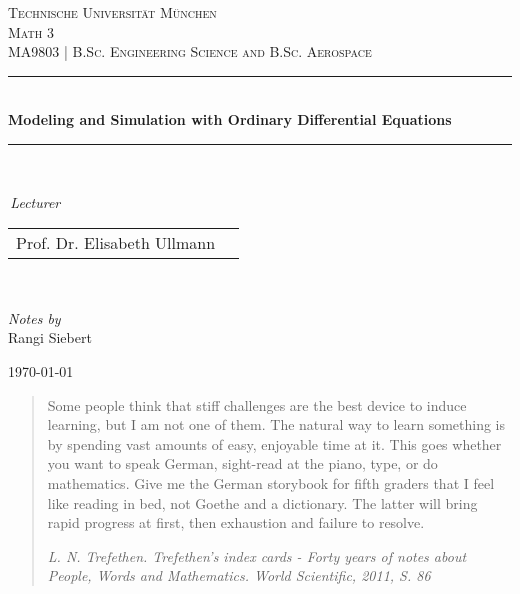 \documentclass[]{article}
\newcommand{\HRule}{\rule{\linewidth}{0.5mm}} %
\begin{document}
\begin{titlingpage}
  \begin{center}

    \vspace*{1cm}
    \textsc{\large Technische Universität München}\\[1.5cm]
    \textsc{\Large Math 3}\\[0.5cm]
    \textsc{\large MA9803 | B.Sc. Engineering Science and B.Sc. Aerospace}\\[0.5cm]

    \HRule\\[0.4cm]
    {\huge\bfseries Modeling and Simulation with Ordinary Differential Equations}\\[0.4cm]
    \HRule\\[0.4cm]

    \begin{minipage}{0.4\textwidth}
      \begin{flushleft}
        \scriptsize
        \;\,\textit{Lecturer}\\[1ex]
        \begin{tabular}{ll}
           Prof. Dr. Elisabeth Ullmann &\\
        \end{tabular}
      \end{flushleft}
    \end{minipage}
    ~
    \begin{minipage}{0.4\textwidth}
      \begin{flushright}
        \small
        \textit{Notes by}\\
	Rangi Siebert\\

      \end{flushright}
    \end{minipage}

    \vfill\vfill\vfill

    {\large\today}

    \vfill
  \end{center}

\end{titlingpage}

\begin{abstract}
	Some people think that stiff challenges are the best device to induce learning, but I am not one of them. The natural way to learn something is by spending vast amounts of easy, enjoyable time at it. This goes whether you want to speak German, sight-read at the piano, type, or do mathematics. Give me the German storybook for fifth graders that I feel like reading in bed, not Goethe and a dictionary. The latter will bring rapid progress at first, then exhaustion and failure to resolve. 
	\par\small \textit{L. N. Trefethen. Trefethen’s index cards - Forty years of notes about People, Words and Mathematics. World Scientific, 2011, S. 86}
\end{abstract}
\tableofcontents
\newpage
\end{document}
